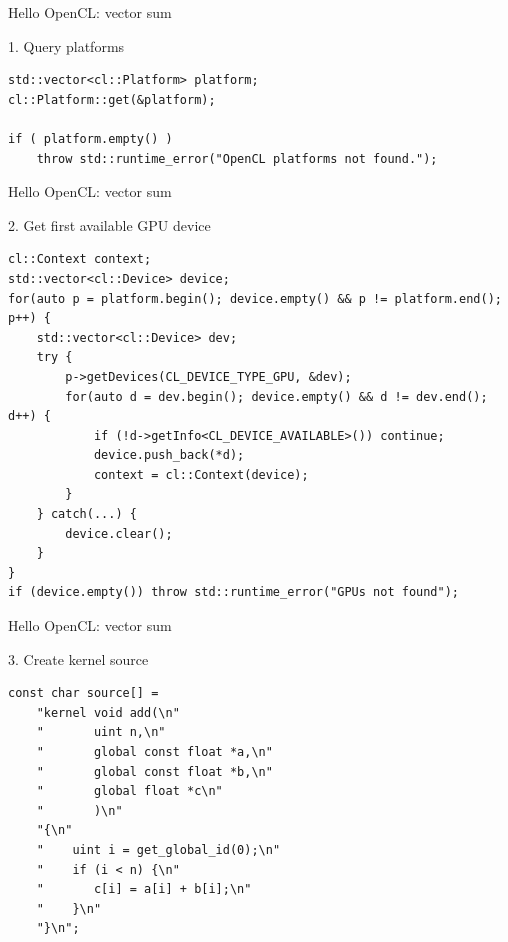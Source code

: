 \documentclass[@BEAMER_OPTIONS@]{beamer}
\begin{document}
\begin{frame}[fragile]{Hello OpenCL: vector sum}
    \begin{exampleblock}{1. Query platforms}
        \begin{lstlisting}
std::vector<cl::Platform> platform;
cl::Platform::get(&platform);

if ( platform.empty() )
    throw std::runtime_error("OpenCL platforms not found.");
        \end{lstlisting}
    \end{exampleblock}
\end{frame}


\begin{frame}[fragile]{Hello OpenCL: vector sum}
    \begin{exampleblock}{2. Get first available GPU device}
        \begin{lstlisting}[firstnumber=last]
cl::Context context;
std::vector<cl::Device> device;
for(auto p = platform.begin(); device.empty() && p != platform.end(); p++) {
    std::vector<cl::Device> dev;
    try {
        p->getDevices(CL_DEVICE_TYPE_GPU, &dev);
        for(auto d = dev.begin(); device.empty() && d != dev.end(); d++) {
            if (!d->getInfo<CL_DEVICE_AVAILABLE>()) continue;
            device.push_back(*d);
            context = cl::Context(device);
        }
    } catch(...) {
        device.clear();
    }
}
if (device.empty()) throw std::runtime_error("GPUs not found");
        \end{lstlisting}
    \end{exampleblock}
\end{frame}


\begin{frame}[fragile]{Hello OpenCL: vector sum}
    \begin{exampleblock}{3. Create kernel source}
        \begin{lstlisting}[firstnumber=last]
const char source[] =
    "kernel void add(\n"
    "       uint n,\n"
    "       global const float *a,\n"
    "       global const float *b,\n"
    "       global float *c\n"
    "       )\n"
    "{\n"
    "    uint i = get_global_id(0);\n"
    "    if (i < n) {\n"
    "       c[i] = a[i] + b[i];\n"
    "    }\n"
    "}\n";
        \end{lstlisting}
    \end{exampleblock}
\end{frame}
\end{document}
